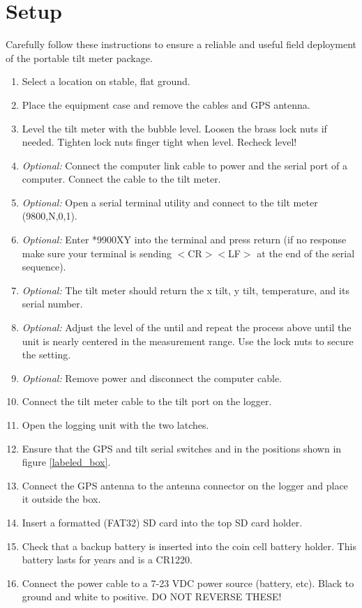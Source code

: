 \documentclass[11pt]{article} %
\begin{document}
\newpage
\section{Setup}
Carefully follow these instructions to ensure a reliable and useful field deployment of the portable tilt meter package. 

\begin{enumerate}
\item Select a location on stable, flat ground.
\item Place the equipment case and remove the cables and GPS antenna.
\item Level the tilt meter with the bubble level. Loosen the brass lock nuts if needed. Tighten lock nuts finger tight when level. Recheck level!
\item \emph{Optional:} Connect the computer link cable to power and the serial port of a computer. Connect the cable to the tilt meter.
\item \emph{Optional:} Open a serial terminal utility and connect to the tilt meter (9800,N,0,1).
\item \emph{Optional:} Enter *9900XY into the terminal and press return (if no response make sure your terminal is sending $<$CR$><$LF$>$ at the end of the serial sequence).
\item \emph{Optional:} The tilt meter should return the x tilt, y tilt, temperature, and its serial number.
\item \emph{Optional:} Adjust the level of the until and repeat the process above until the unit is nearly centered in the measurement range. Use the lock nuts to secure the setting.
\item \emph{Optional:} Remove power and disconnect the computer cable. 
\item Connect the tilt meter cable to the tilt port on the logger.
\item Open the logging unit with the two latches.
\item Ensure that the GPS and tilt serial switches and in the positions shown in figure \ref{labeled_box}.
\item Connect the GPS antenna to the antenna connector on the logger and place it outside the box.
\item Insert a formatted (FAT32) SD card into the top SD card holder.
\item Check that a backup battery is inserted into the coin cell battery holder. This battery lasts for years and is a CR1220. 
\item Connect the power cable to a 7-23 VDC power source (battery, etc). Black to ground and white to positive. DO NOT REVERSE THESE!

\end{enumerate}
\end{document}
